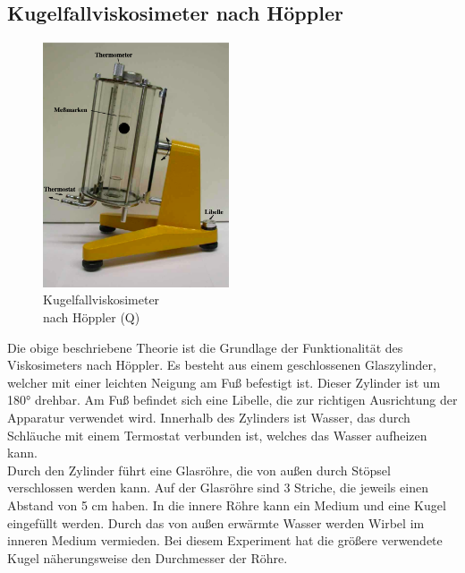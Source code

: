         \subsection{Kugelfallviskosimeter nach Höppler}
            \begin{figure}
                \begin{center}
                    \includegraphics[width=5.5cm]{content/Viskosimeter.png}
                    \caption[width=5.5cm]{Kugelfallviskosimeter\\nach Höppler (Q\cite{anleitungV207})}
                \end{center}
                
                \label{fig:Kugelfallviskosimeter}
            \end{figure}
            Die obige beschriebene Theorie ist die Grundlage der Funktionalität des Viskosimeters 
            nach Höppler. Es besteht aus einem geschlossenen Glaszylinder, 
            welcher mit einer leichten Neigung am Fuß befestigt
            ist. Dieser Zylinder ist um 180° drehbar. Am Fuß befindet sich eine Libelle, die zur 
            richtigen Ausrichtung der Apparatur verwendet wird. 
            Innerhalb des Zylinders ist Wasser, das durch Schläuche mit einem Termostat verbunden ist,
            welches das Wasser aufheizen kann. \\
            Durch den Zylinder führt eine Glasröhre, die von außen durch Stöpsel 
            verschlossen werden kann. Auf der Glasröhre sind 3 Striche, die jeweils 
            einen Abstand von 5 \unit{\centi\meter} haben. In die innere Röhre kann
            ein Medium und eine Kugel eingefüllt werden. Durch das von außen erwärmte Wasser werden Wirbel im inneren Medium vermieden. 
            Bei diesem Experiment hat die größere verwendete Kugel näherungsweise den Durchmesser der Röhre. 
